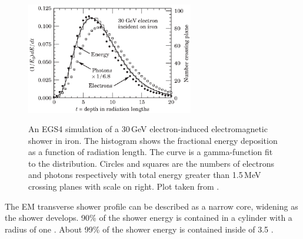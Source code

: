 \begin{figure}[tbph]
\centering
{\includegraphics[width=0.65\textwidth]{photon/EMlong}}
\caption[Simulated longitudinal electromagnetic shower profile as a function of depth for electrons and photons.]
{An EGS4 \cite{Ford:1978jp,Hirayama:296198} simulation of a 30\,GeV electron-induced electromagnetic shower in iron. The histogram shows the fractional energy deposition as a function of radiation length. The curve is a gamma-function fit to the distribution. Circles and squares are the numbers of electrons and photons respectively with total energy greater than 1.5\,MeV crossing planes with scale on right. Plot taken from \cite{Agashe:2014kda}.}
\label{fig:photonEMlongProfile}
\end{figure}

The EM transverse shower profile can be described as  a narrow core,  widening as the shower develops. 90\% of the shower energy  is contained in a cylinder with a radius of one \RM. About 99\% of the shower energy  is contained inside of 3.5 \RMs \cite{PhysRev.149.201,Bathow:1970dn}.






